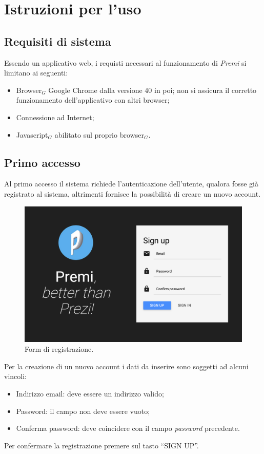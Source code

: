 \section{Istruzioni per l'uso}
\subsection{Requisiti di sistema}
Essendo un applicativo web, i requisti necessari al funzionamento di \emph{Premi} si limitano ai seguenti:
\begin{itemize}
\item Browser$_G$ Google Chrome dalla versione 40 in poi; non si assicura il corretto funzionamento dell'applicativo con altri browser;
\item Connessione ad Internet;
\item Javascript$_G$ abilitato sul proprio browser$_G$.
\end{itemize}

\newpage
\subsection{Primo accesso}
Al primo accesso il sistema richiede l'autenticazione dell'utente, qualora fosse già registrato al sistema, altrimenti fornisce la possibilità di creare un nuovo account.
\begin{figure}[!h]
\begin{center}
\includegraphics[scale=0.4]{img/signup.png}
\caption{Form di registrazione.}
\end{center}
\end{figure}

Per la creazione di un nuovo account i dati da inserire sono soggetti ad alcuni vincoli:
\begin{itemize}
\item Indirizzo email: deve essere un indirizzo valido;
\item Password: il campo non deve essere vuoto;
\item Conferma password: deve coincidere con il campo \emph{password} precedente.
\end{itemize}
Per confermare la registrazione premere sul tasto ``SIGN UP''.

